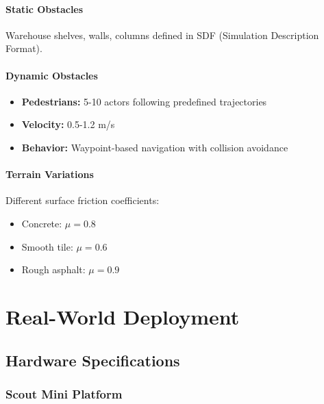 \paragraph{Static Obstacles}
Warehouse shelves, walls, columns defined in SDF (Simulation Description Format).

\paragraph{Dynamic Obstacles}
\begin{itemize}
    \item \textbf{Pedestrians:} 5-10 actors following predefined trajectories
    \item \textbf{Velocity:} 0.5-1.2 m/s
    \item \textbf{Behavior:} Waypoint-based navigation with collision avoidance
\end{itemize}

\paragraph{Terrain Variations}
Different surface friction coefficients:
\begin{itemize}
    \item Concrete: $\mu = 0.8$
    \item Smooth tile: $\mu = 0.6$
    \item Rough asphalt: $\mu = 0.9$
\end{itemize}

\section{Real-World Deployment}
\label{sec:impl_real_robot}

\subsection{Hardware Specifications}

\subsubsection{Scout Mini Platform}

